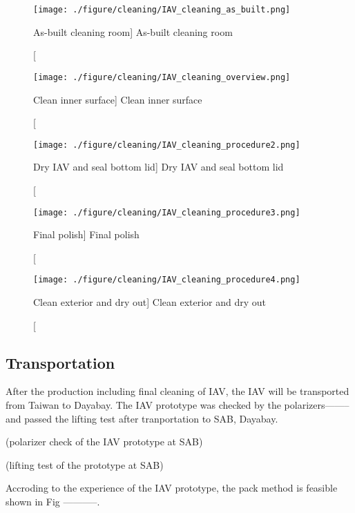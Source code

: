\begin{figure}
    \centering
    \texttt{[image: ./figure/cleaning/IAV\_cleaning\_as\_built.png]}
    \caption
    [As-built cleaning room]
    {As-built cleaning room}
    \label{fig:IAV_cleaning_as_built.png}
    \end{figure}

\begin{figure}
    \centering
    \texttt{[image: ./figure/cleaning/IAV\_cleaning\_overview.png]}
    \caption
    [Clean inner surface]
    {Clean inner surface}
    \label{fig:IAV_cleaning_overview.png}
    \end{figure}

\begin{figure}
    \centering
    \texttt{[image: ./figure/cleaning/IAV\_cleaning\_procedure2.png]}
    \caption
    [Dry IAV and seal bottom lid]
    {Dry IAV and seal bottom lid}
    \label{fig:IAV_cleaning_procedure2.png}
    \end{figure}

\begin{figure}
    \centering
    \texttt{[image: ./figure/cleaning/IAV\_cleaning\_procedure3.png]}
    \caption
    [Final polish]
    {Final polish}
    \label{fig:IAV_cleaning_procedure3.png}
    \end{figure}

\begin{figure}
    \centering
    \texttt{[image: ./figure/cleaning/IAV\_cleaning\_procedure4.png]}
    \caption
    [Clean exterior and dry out]
    {Clean exterior and dry out}
    \label{fig:IAV_cleaning_procedure4.png}
    \end{figure}


\subsection {Transportation}

After the production including final cleaning of IAV, the IAV will be
transported from Taiwan to Dayabay.
The IAV prototype was checked by the polarizers-------- and passed
the lifting test after tranportation to SAB, Dayabay.


(polarizer check of the IAV prototype at SAB)




(lifting test of the prototype at SAB)


Accroding to the experience of the IAV
prototype, the pack method is feasible shown in Fig -----------.


